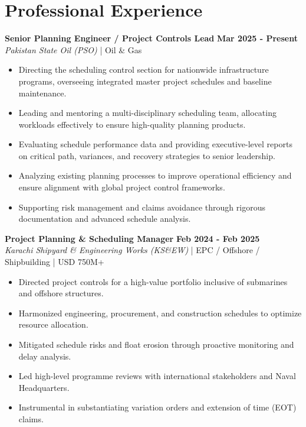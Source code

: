 \documentclass[11pt,a4paper]{article}
\begin{document}
\section{Professional Experience}
\noindent \textbf{\large Senior Planning Engineer / Project Controls Lead} \hfill \textbf{\color{awesome-blue}Mar 2025 - Present}\\
\textit{Pakistan State Oil (PSO)} | Oil \& Gas\\
\begin{itemize}
    \item Directing the scheduling control section for nationwide infrastructure programs, overseeing integrated master project schedules and baseline maintenance.
    \item Leading and mentoring a multi-disciplinary scheduling team, allocating workloads effectively to ensure high-quality planning products.
    \item Evaluating schedule performance data and providing executive-level reports on critical path, variances, and recovery strategies to senior leadership.
    \item Analyzing existing planning processes to improve operational efficiency and ensure alignment with global project control frameworks.
    \item Supporting risk management and claims avoidance through rigorous documentation and advanced schedule analysis.
\end{itemize}

\noindent \textbf{\large Project Planning \& Scheduling Manager} \hfill \textbf{\color{awesome-blue}Feb 2024 - Feb 2025}\\
\textit{Karachi Shipyard \& Engineering Works (KS\&EW)} | EPC / Offshore / Shipbuilding | USD 750M+\\
\begin{itemize}
    \item Directed project controls for a high-value portfolio inclusive of submarines and offshore structures.
    \item Harmonized engineering, procurement, and construction schedules to optimize resource allocation.
    \item Mitigated schedule risks and float erosion through proactive monitoring and delay analysis.
    \item Led high-level programme reviews with international stakeholders and Naval Headquarters.
    \item Instrumental in substantiating variation orders and extension of time (EOT) claims.
\end{itemize}
\end{document}
